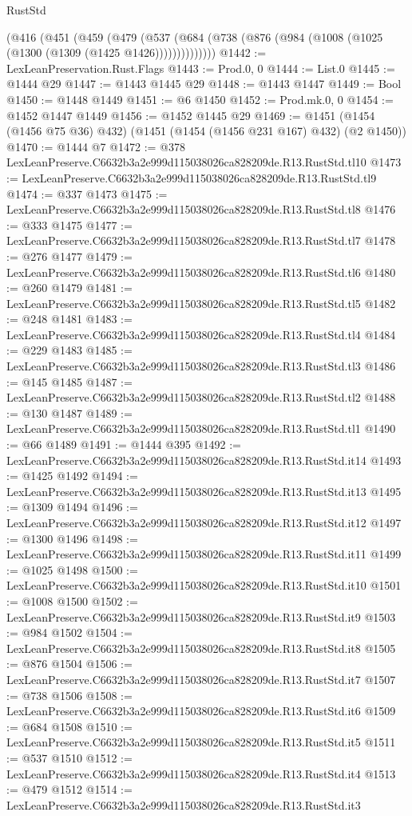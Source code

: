 \begin{lexlean}{RustStd}
\begin{coremodule}
    (@416
      (@451
        (@459
          (@479 (@537 (@684 (@738 (@876 (@984 (@1008 (@1025 (@1300 (@1309 (@1425 @1426))))))))))))))
@1442 := LexLeanPreservation.Rust.Flags
@1443 := Prod.{0, 0}
@1444 := List.{0}
@1445 := @1444 @29
@1447 := @1443 @1445 @29
@1448 := @1443 @1447
@1449 := Bool
@1450 := @1448 @1449
@1451 := @6 @1450
@1452 := Prod.mk.{0, 0}
@1454 := @1452 @1447 @1449
@1456 := @1452 @1445 @29
@1469 := @1451 (@1454 (@1456 @75 @36) @432) (@1451 (@1454 (@1456 @231 @167) @432) (@2 @1450))
@1470 := @1444 @7
@1472 := @378 LexLeanPreserve.C6632b3a2e999d115038026ca828209de.R13.RustStd.tl10
@1473 := LexLeanPreserve.C6632b3a2e999d115038026ca828209de.R13.RustStd.tl9
@1474 := @337 @1473
@1475 := LexLeanPreserve.C6632b3a2e999d115038026ca828209de.R13.RustStd.tl8
@1476 := @333 @1475
@1477 := LexLeanPreserve.C6632b3a2e999d115038026ca828209de.R13.RustStd.tl7
@1478 := @276 @1477
@1479 := LexLeanPreserve.C6632b3a2e999d115038026ca828209de.R13.RustStd.tl6
@1480 := @260 @1479
@1481 := LexLeanPreserve.C6632b3a2e999d115038026ca828209de.R13.RustStd.tl5
@1482 := @248 @1481
@1483 := LexLeanPreserve.C6632b3a2e999d115038026ca828209de.R13.RustStd.tl4
@1484 := @229 @1483
@1485 := LexLeanPreserve.C6632b3a2e999d115038026ca828209de.R13.RustStd.tl3
@1486 := @145 @1485
@1487 := LexLeanPreserve.C6632b3a2e999d115038026ca828209de.R13.RustStd.tl2
@1488 := @130 @1487
@1489 := LexLeanPreserve.C6632b3a2e999d115038026ca828209de.R13.RustStd.tl1
@1490 := @66 @1489
@1491 := @1444 @395
@1492 := LexLeanPreserve.C6632b3a2e999d115038026ca828209de.R13.RustStd.it14
@1493 := @1425 @1492
@1494 := LexLeanPreserve.C6632b3a2e999d115038026ca828209de.R13.RustStd.it13
@1495 := @1309 @1494
@1496 := LexLeanPreserve.C6632b3a2e999d115038026ca828209de.R13.RustStd.it12
@1497 := @1300 @1496
@1498 := LexLeanPreserve.C6632b3a2e999d115038026ca828209de.R13.RustStd.it11
@1499 := @1025 @1498
@1500 := LexLeanPreserve.C6632b3a2e999d115038026ca828209de.R13.RustStd.it10
@1501 := @1008 @1500
@1502 := LexLeanPreserve.C6632b3a2e999d115038026ca828209de.R13.RustStd.it9
@1503 := @984 @1502
@1504 := LexLeanPreserve.C6632b3a2e999d115038026ca828209de.R13.RustStd.it8
@1505 := @876 @1504
@1506 := LexLeanPreserve.C6632b3a2e999d115038026ca828209de.R13.RustStd.it7
@1507 := @738 @1506
@1508 := LexLeanPreserve.C6632b3a2e999d115038026ca828209de.R13.RustStd.it6
@1509 := @684 @1508
@1510 := LexLeanPreserve.C6632b3a2e999d115038026ca828209de.R13.RustStd.it5
@1511 := @537 @1510
@1512 := LexLeanPreserve.C6632b3a2e999d115038026ca828209de.R13.RustStd.it4
@1513 := @479 @1512
@1514 := LexLeanPreserve.C6632b3a2e999d115038026ca828209de.R13.RustStd.it3

\end{coremodule}
\end{lexlean}
